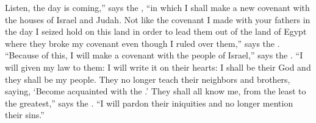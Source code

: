 
\begin{inparaenum}








   Listen, the day is coming,'' says the \lord, ``in which I shall make a new covenant with the houses of Israel and Judah.%
   Not like the covenant I made with your fathers in the day I seized hold on this land in order to lead them out of the land of Egypt where they broke my covenant even though I ruled over them,'' says the \lord.%
   ``Because of this, I will make a covenant with the people of Israel,'' says the \lord. ``I will given my law to them: I will write it on their hearts: I shall be their God and they shall be my people.%
   They no longer teach their neighbors and brothers, saying, `Become acquainted with the \lord.' They shall all know me, from the least to the greatest,'' says the \lord. ``I will pardon their iniquities and no longer mention their sins.''%



\end{inparaenum}
